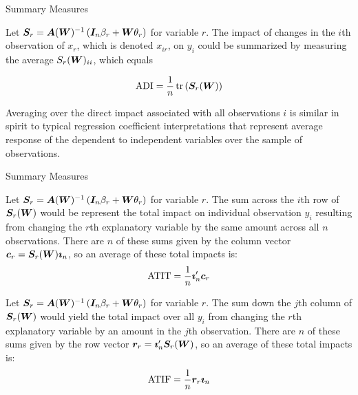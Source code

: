 \documentclass[english,10pt]{beamer}\usepackage[]{graphicx}\usepackage[]{xcolor}
\begin{document}
\begin{frame}{Summary Measures}
\begin{definition}\label{def:ADI}
Let $\bm S_r = \bm A(\bm W)^{-1}\left(\bm I_n\beta_r + \bm W\theta_r\right)$ for variable $r$. The impact of changes in the $i$th observation of $x_r$, which is denoted $x_{ir}$, on $y_i$ could be summarized by measuring the average $S_r(\bm W)_{ii}$, which equals
	
	\begin{equation}
		\mbox{ADI} = \frac{1}{n}\operatorname{tr}\left(\bm S_r(\bm W)\right)
	\end{equation}
\end{definition}
Averaging over the direct impact associated with all observations $i$ is similar in spirit to typical regression coefficient interpretations that represent average response of the dependent to independent variables over the sample of observations. 	
\end{frame}

\begin{frame}{Summary Measures}
\begin{definition}\label{def:ATIT}
	Let $\bm S_r = \bm A(\bm W)^{-1}\left(\bm I_n\beta_r + \bm W\theta_r\right)$ for variable $r$. The sum across the $i$th row of $\bm S_r(\bm W)$ would be represent the total impact on individual observation $y_i$ resulting from changing the $r$th explanatory variable by the same amount across all $n$ observations. There are $n$ of these sums given by the column vector $\bm c_r = \bm S_r(\bm W)\bm\imath_n$, so an average of these total impacts is:
		\begin{equation}
		\mbox{ATIT} = \frac{1}{n} \bm\imath_n'\bm c_r
		\end{equation} 
\end{definition}
\begin{definition}\label{def:ATIF}
	Let $\bm S_r = \bm A(\bm W)^{-1}\left(\bm I_n\beta_r + \bm W\theta_r\right)$ for variable $r$. The sum down the $j$th column of $\bm S_r(\bm W)$ would yield the total impact over all $y_i$ from changing the $r$th explanatory variable by an amount in the $j$th observation. There are $n$ of these sums given by the row vector $\bm r_r = \bm\imath_n'\bm S_{r}(\bm W)$, so an average of these total impacts is:
				\begin{equation}
				\mbox{ATIF} = \frac{1}{n} \bm r_r\bm\imath_n
				\end{equation} 
\end{definition}
\end{frame}
\end{document}
